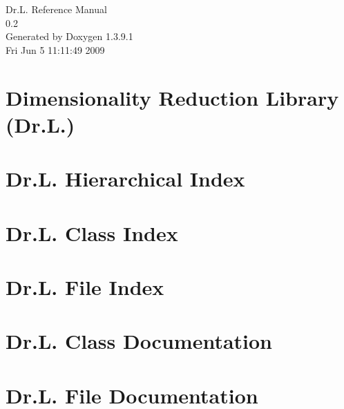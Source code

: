 \documentclass[a4paper]{book}
\begin{document}
\begin{titlepage}
\vspace*{7cm}
\begin{center}
{\Large Dr.L. Reference Manual\\[1ex]\large 0.2 }\\
\vspace*{1cm}
{\large Generated by Doxygen 1.3.9.1}\\
\vspace*{0.5cm}
{\small Fri Jun 5 11:11:49 2009}\\
\end{center}
\end{titlepage}
\clearemptydoublepage
{}
\tableofcontents
\clearemptydoublepage
{}
\chapter{Dimensionality Reduction Library (Dr.L.) }
\label{index}\hypertarget{index}{}
\chapter{Dr.L. Hierarchical Index}

\chapter{Dr.L. Class Index}

\chapter{Dr.L. File Index}

\chapter{Dr.L. Class Documentation}







\chapter{Dr.L. File Documentation}







\printindex
\end{document}
